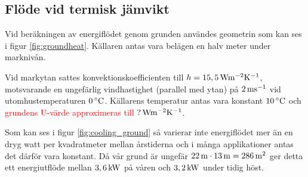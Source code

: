 \subsection{Flöde vid termisk jämvikt}

Vid beräkningen av energiflödet genom grunden användes geometrin som kan ses i figur \ref{fig:groundheat}. Källaren antas vara belägen en halv meter under marknivån.

Vid markytan sattes konvektionskoefficienten till $h=\unit[15,5]{Wm^{-2}K^{-1}}$, motsvarande en ungefärlig vindhastighet (parallel med ytan) på $\unit[2]{ms^{-1}}$ vid utomhustemperaturen $\unit[0]{^{\circ}C}$. Källarens temperatur antas vara konstant $\unit[10]{^{\circ}C}$ och \textcolor{red}{grundens U-värde approximeras till $\unit[?]{Wm^{-2}K^{-1}}$}.

Som kan ses i figur \ref{fig:cooling_ground} så varierar inte energiflödet mer än en dryg watt per kvadratmeter mellan årstiderna och i många applikationer antas det därför vara konstant. Då vår grund är ungefär $\unit[22]{m}\cdot\unit[13]{m}=\unit[286]{m^2}$ ger detta ett energiutflöde mellan $\unit[3,6]{kW}$ på våren och $\unit[3,2]{kW}$ under tidig höst. 




